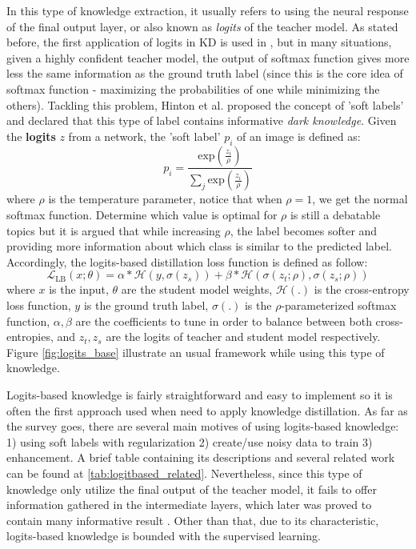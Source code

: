 In this type of knowledge extraction, it usually refers to using the neural response of the final output layer, or also known as \textit{logits} of the teacher model. As stated before, the first application of logits in KD is used in \cite{firstkdpaper}, but in many situations, given a highly confident teacher model, the output of softmax function gives more less the same information as the ground truth label (since this is the core idea of softmax function - maximizing the probabilities of one while minimizing the others). Tackling this problem, Hinton et al. \cite{hintonfirstkd} proposed the concept of 'soft labels' and declared that this type of label contains informative \textit{dark knowledge}. Given the \textbf{logits} $z$ from a network, the 'soft label' $p_i$ of an image is defined as:
\[
   p_i = \frac{\text{exp}(\frac{z_i}{\rho})}{\sum_j \text{exp}(\frac{z_i}{\rho})}
\]
where $\rho$ is the temperature parameter, notice that when $\rho=1$, we get the normal softmax function. Determine which value is optimal for $\rho$ is still a debatable topics but it is argued that while increasing $\rho$, the label becomes softer and providing more information about which class is similar to the predicted label. Accordingly, the logits-based distillation loss function is defined as follow:
\[
   \mathcal{L}_{\text{LB}}(x;\theta) = \alpha * \mathcal{H}(y, \sigma(z_s)) + \beta * \mathcal{H}(\sigma(z_t;\rho), \sigma(z_s;\rho))
\]
where $x$ is the input, $\theta$ are the student model weights, $\mathcal{H}(.)$ is the cross-entropy loss function, $y$ is the ground truth label, $\sigma(.)$ is the $\rho$-parameterized softmax function, $\alpha, \beta$ are the coefficients to tune in order to balance between both cross-entropies, and $z_t, z_s$ are the logits of teacher and student model respectively. Figure \ref{fig:logits_base} illustrate an usual framework while using this type of knowledge.

Logits-based knowledge is fairly straightforward and easy to implement so it is often the first approach used when need to apply knowledge distillation. As far as the survey goes, there are several main motives of using logits-based knowledge: 1) using soft labels with regularization 2) create/use noisy data to train 3) enhancement. A brief table containing its descriptions and several related work can be found at \ref{tab:logitbased_related}. Nevertheless, since this type of knowledge only utilize the final output of the teacher model, it fails to offer information gathered in the intermediate layers, which later was proved to contain many informative result \cite{featurebased01}. Other than that, due to its characteristic, logits-based knowledge is bounded with the supervised learning.

